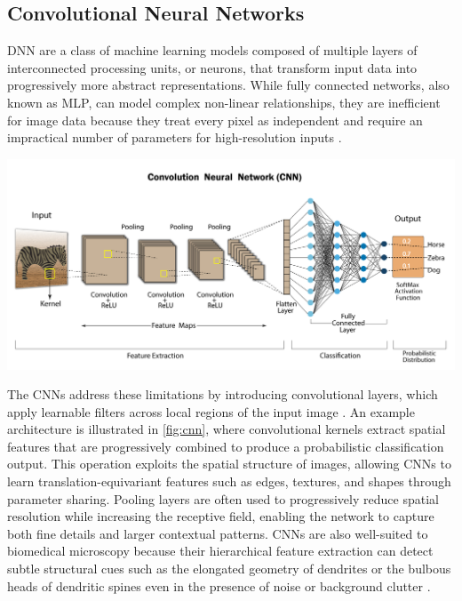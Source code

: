 \subsection{Convolutional Neural Networks}
\gls{DNN} are a class of machine learning models composed of multiple layers of interconnected processing units, or neurons, that transform input data into progressively more abstract representations. While fully connected networks, also known as \gls{MLP}, can model complex non-linear relationships, they are inefficient for image data because they treat every pixel as independent and require an impractical number of parameters for high-resolution inputs \cite{Goodfellow_2016}.

\begin{center}
    \includegraphics[width=.9\textwidth]{figures/09_cnn.png} 
    \label{fig:cnn}
\end{center}

The \gls{CNN}s address these limitations by introducing convolutional layers, which apply learnable filters across local regions of the input image \cite{LeCun_1989}. An example architecture is illustrated in \autoref{fig:cnn}, where convolutional kernels extract spatial features that are progressively combined to produce a probabilistic classification output. This operation exploits the spatial structure of images, allowing \gls{CNN}s to learn translation-equivariant features such as edges, textures, and shapes through parameter sharing. Pooling layers are often used to progressively reduce spatial resolution while increasing the receptive field, enabling the network to capture both fine details and larger contextual patterns. \gls{CNN}s are also well-suited to biomedical microscopy because their hierarchical feature extraction can detect subtle structural cues such as the elongated geometry of dendrites or the bulbous heads of dendritic spines even in the presence of noise or background clutter \cite{Ronneberger_2015, Falk_2019}.

